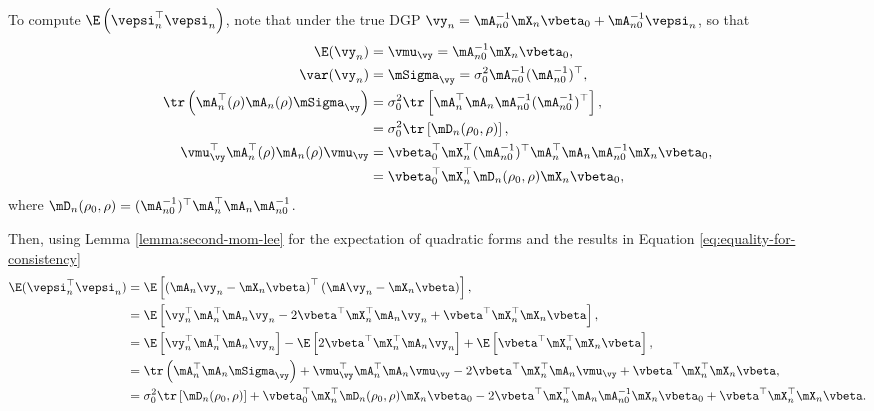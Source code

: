 \documentclass[english,12pt]{book}\usepackage[]{graphicx}\usepackage[]{xcolor}
\begin{document}
\begin{subappendices}
To compute $\E\left(\vepsi_n^\top\vepsi_n\right)$, note that under the true DGP $\vy_n = \mA_{n0}^{-1}\mX_n\vbeta_0 + \mA_{n0}^{-1}\vepsi_n$, so that 
\begin{equation}\label{eq:equality-for-consistency}
\begin{aligned}
\E(\vy_n) & = \vmu_{\vy}     = \mA_{n0}^{-1}\mX_n\vbeta_0, \\
\var(\vy_n)& = \mSigma_{\vy}  = \sigma_0^2\mA_{n0}^{-1}(\mA_{n0}^{-1})^\top, \\
\tr\left(\mA_n^\top(\rho)\mA_n(\rho)\mSigma_{\vy}\right) & = \sigma_0^2\tr\left[\mA_n^\top\mA_n\mA_{n0}^{-1}(\mA_{n0}^{-1})^\top\right], \\
& = \sigma_0^2\tr\left[\mD_n(\rho_0, \rho)\right], \\
\vmu_{\vy}^\top\mA_n^\top(\rho)\mA_n(\rho)\vmu_{\vy} & = \vbeta_0^\top\mX_n^\top(\mA_{n0}^{-1})^\top\mA_n^\top\mA_n\mA_{n0}^{-1}\mX_n\vbeta_0, \\
& = \vbeta_0^\top\mX_n^\top\mD_n(\rho_0, \rho)\mX_n\vbeta_0,
\end{aligned}
\end{equation}
%
where $\mD_n(\rho_0, \rho) = (\mA_{n0}^{-1})^\top\mA_n^\top\mA_n\mA_{n0}^{-1}$.

Then, using Lemma \ref{lemma:second-mom-lee} for the expectation of quadratic forms and the results in Equation \eqref{eq:equality-for-consistency}
\begin{equation*}
\begin{aligned}
\E(\vepsi_n^\top\vepsi_n) & = \E\left[\left(\mA_n\vy_n - \mX_n\vbeta\right)^\top\left(\mA\vy_n - \mX_n\vbeta\right)\right], \\
& = \E\left[\vy_n^\top\mA_n^\top\mA_n\vy_n - 2\vbeta^\top\mX_n^\top\mA_n\vy_n + \vbeta^\top\mX_n^\top\mX_n\vbeta\right], \\
& = \E\left[\vy_n^\top\mA_n^\top\mA_n\vy_n \right]- \E\left[2\vbeta^\top\mX_n^\top\mA_n\vy_n\right] + \E\left[\vbeta^\top\mX_n^\top\mX_n\vbeta\right], \\
& = \tr\left(\mA_n^\top\mA_n\mSigma_{\vy}\right) + \vmu_{\vy}^\top\mA_n^\top\mA_n\vmu_{\vy} - 2\vbeta^\top\mX_n^\top\mA_n\vmu_{\vy} + \vbeta^\top\mX_n^\top\mX_n\vbeta, \\
& = \sigma_0^2\tr\left[\mD_n(\rho_0, \rho)\right] + \vbeta_0^\top\mX_n^\top\mD_n(\rho_0, \rho)\mX_n\vbeta_0 -2\vbeta^\top\mX_n^\top\mA_n\mA_{n0}^{-1}\mX_n\vbeta_0 + \vbeta^\top\mX_n^\top\mX_n\vbeta.
\end{aligned}
\end{equation*}


\end{subappendices}
\end{document}
